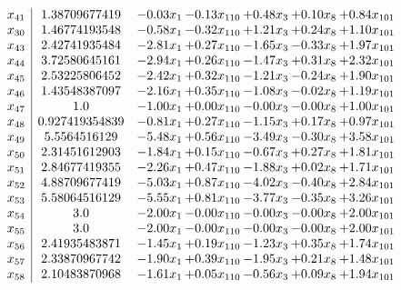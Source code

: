 \documentclass[8pt]{article}
\begin{document}
\[\begin{array}{c| c c@{\hskip 2pt} c@{\hskip 2pt} c@{\hskip 2pt} c@{\hskip 2pt} c@{\hskip 2pt} }
 x_{41}   &  1.38709677419 & -0.03 x_{1} & -0.13 x_{110} & +  0.48 x_{3} & +  0.10 x_{8} & +  0.84 x_{101}\\
 x_{30}   &  1.46774193548 & -0.58 x_{1} & -0.32 x_{110} & +  1.21 x_{3} & +  0.24 x_{8} & +  1.10 x_{101}\\
 x_{43}   &  2.42741935484 & -2.81 x_{1} & +  0.27 x_{110} & -1.65 x_{3} & -0.33 x_{8} & +  1.97 x_{101}\\
 x_{44}   &  3.72580645161 & -2.94 x_{1} & +  0.26 x_{110} & -1.47 x_{3} & +  0.31 x_{8} & +  2.32 x_{101}\\
 x_{45}   &  2.53225806452 & -2.42 x_{1} & +  0.32 x_{110} & -1.21 x_{3} & -0.24 x_{8} & +  1.90 x_{101}\\
 x_{46}   &  1.43548387097 & -2.16 x_{1} & +  0.35 x_{110} & -1.08 x_{3} & -0.02 x_{8} & +  1.19 x_{101}\\
 x_{47}   &  1.0 & -1.00 x_{1} & +  0.00 x_{110} & -0.00 x_{3} & -0.00 x_{8} & +  1.00 x_{101}\\
 x_{48}   &  0.927419354839 & -0.81 x_{1} & +  0.27 x_{110} & -1.15 x_{3} & +  0.17 x_{8} & +  0.97 x_{101}\\
 x_{49}   &  5.5564516129 & -5.48 x_{1} & +  0.56 x_{110} & -3.49 x_{3} & -0.30 x_{8} & +  3.58 x_{101}\\
 x_{50}   &  2.31451612903 & -1.84 x_{1} & +  0.15 x_{110} & -0.67 x_{3} & +  0.27 x_{8} & +  1.81 x_{101}\\
 x_{51}   &  2.84677419355 & -2.26 x_{1} & +  0.47 x_{110} & -1.88 x_{3} & +  0.02 x_{8} & +  1.71 x_{101}\\
 x_{52}   &  4.88709677419 & -5.03 x_{1} & +  0.87 x_{110} & -4.02 x_{3} & -0.40 x_{8} & +  2.84 x_{101}\\
 x_{53}   &  5.58064516129 & -5.55 x_{1} & +  0.81 x_{110} & -3.77 x_{3} & -0.35 x_{8} & +  3.26 x_{101}\\
 x_{54}   &  3.0 & -2.00 x_{1} & -0.00 x_{110} & -0.00 x_{3} & -0.00 x_{8} & +  2.00 x_{101}\\
 x_{55}   &  3.0 & -2.00 x_{1} & -0.00 x_{110} & -0.00 x_{3} & -0.00 x_{8} & +  2.00 x_{101}\\
 x_{56}   &  2.41935483871 & -1.45 x_{1} & +  0.19 x_{110} & -1.23 x_{3} & +  0.35 x_{8} & +  1.74 x_{101}\\
 x_{57}   &  2.33870967742 & -1.90 x_{1} & +  0.39 x_{110} & -1.95 x_{3} & +  0.21 x_{8} & +  1.48 x_{101}\\
 x_{58}   &  2.10483870968 & -1.61 x_{1} & +  0.05 x_{110} & -0.56 x_{3} & +  0.09 x_{8} & +  1.94 x_{101}\\

\end{array}\]
\end{document}
